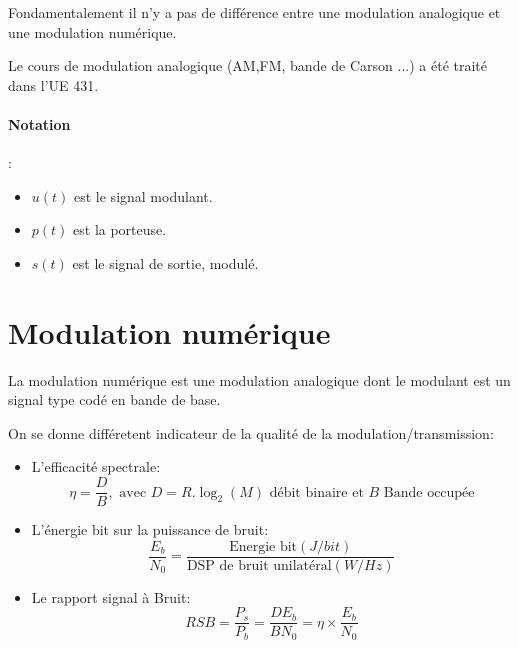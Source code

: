 \documentclass[main.tex]{subfiles}
\begin{document}
Fondamentalement il n'y a pas de différence entre une modulation analogique et une modulation numérique.
\begin{rem}
  Le cours de modulation analogique (AM,FM, bande de Carson ...) a été traité dans l'UE 431.
\end{rem}
\paragraph{Notation}:
\begin{itemize}
\item $u(t)$ est le signal modulant.
\item $p(t)$ est la porteuse.
\item $s(t)$ est le signal de sortie, modulé.
\end{itemize}

\section{Modulation numérique}
\begin{defin}
  La modulation numérique est une modulation analogique dont le modulant est un signal type codé en bande de base.
\end{defin}
\begin{prop}
  On se donne différetent indicateur de la qualité de la modulation/transmission:
  \begin{itemize}
  \item L'efficacité spectrale:
    \[
      \eta = \frac{D}{B} ,\text{ avec } D = R.\log_2(M) \text{ débit binaire  et } B \text{ Bande occupée}
    \]
  \item L'énergie bit sur la puissance de bruit:
    \[
      \frac{E_b}{N_0} = \frac{\text{Energie bit} (J/bit)}{\text{DSP de bruit unilatéral} (W/Hz)}
    \]
  \item Le rapport signal à Bruit:
    \[
      RSB = \frac{P_s}{P_b} = \frac{DE_b}{BN_0} = \eta \times \frac{E_b}{N_0}
    \]
  \end{itemize}
\end{prop}
\end{document}
